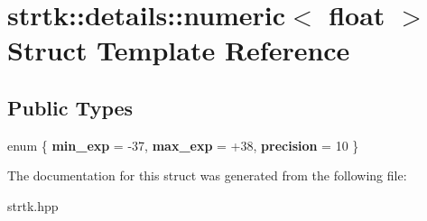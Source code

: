 \hypertarget{structstrtk_1_1details_1_1numeric_3_01float_01_4}{\section{strtk\-:\-:details\-:\-:numeric$<$ float $>$ Struct Template Reference}
\label{structstrtk_1_1details_1_1numeric_3_01float_01_4}
}
\subsection*{Public Types}
\begin{DoxyCompactItemize}
\item 
enum \{ {\bfseries min\-\_\-exp} = -\/37, 
{\bfseries max\-\_\-exp} = +38, 
{\bfseries precision} = 10
 \}
\end{DoxyCompactItemize}


The documentation for this struct was generated from the following file\-:\begin{DoxyCompactItemize}
\item 
strtk.\-hpp\end{DoxyCompactItemize}
